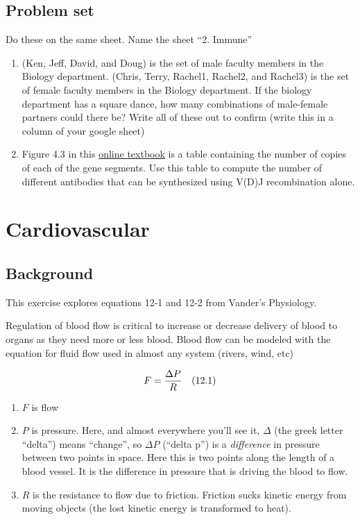 \documentclass[]{book}
\providecommand{\tightlist}{%
  \setlength{\itemsep}{0pt}\setlength{\parskip}{0pt}}
\begin{document}
\section{Problem set}\label{problem-set-2}

Do these on the same sheet. Name the sheet ``2. Immune''

\begin{enumerate}
\def\labelenumi{\arabic{enumi}.}
\item
  (Ken, Jeff, David, and Doug) is the set of male faculty members in the
  Biology department. (Chris, Terry, Rachel1, Rachel2, and Rachel3) is
  the set of female faculty members in the Biology department. If the
  biology department has a square dance, how many combinations of
  male-female partners could there be? Write all of these out to confirm
  (write this in a column of your google sheet)
\item
  Figure 4.3 in this
  \href{https://www.ncbi.nlm.nih.gov/books/NBK27140/}{online textbook}
  is a table containing the number of copies of each of the gene
  segments. Use this table to compute the number of different antibodies
  that can be synthesized using V(D)J recombination alone.
\end{enumerate}

\chapter{Cardiovascular}\label{cardiovascular}

\section{Background}\label{background}

This exercise explores equations 12-1 and 12-2 from Vander's Physiology.

Regulation of blood flow is critical to increase or decrease delivery of
blood to organs as they need more or less blood. Blood flow can be
modeled with the equation for fluid flow used in almost any system
(rivers, wind, etc)

\begin{equation}
F = \frac{\Delta P}{R} \quad \small{(12.1)}
\end{equation}

\begin{enumerate}
\def\labelenumi{\arabic{enumi}.}
\tightlist
\item
  \(F\) is flow
\item
  \(P\) is pressure. Here, and almost everywhere you'll see it,
  \(\Delta\) (the greek letter ``delta'') means ``change'', so
  \(\Delta P\) (``delta p'') is a \emph{difference} in pressure between
  two points in space. Here this is two points along the length of a
  blood vessel. It is the difference in pressure that is driving the
  blood to flow.
\item
  \(R\) is the resistance to flow due to friction. Friction sucks
  kinetic energy from moving objects (the lost kinetic energy is
  transformed to heat).
\end{enumerate}
\end{document}
